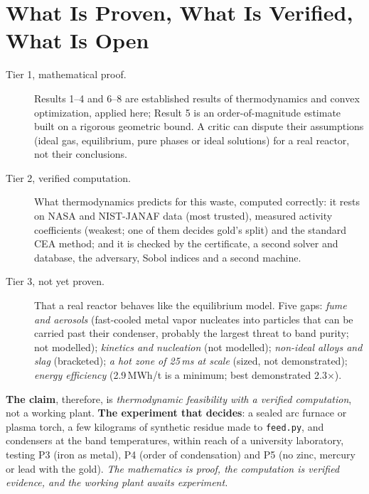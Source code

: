 \documentclass[11pt,a4paper]{article}
\begin{document}
\section{What Is Proven, What Is Verified, What Is Open}\label{ch:feasibility}
\begin{description}
\item[Tier 1, mathematical proof.] Results 1--4 and 6--8 are established results of thermodynamics and convex optimization, applied here; Result 5 is an order-of-magnitude estimate built on a rigorous geometric bound. A critic can dispute their assumptions (ideal gas, equilibrium, pure phases or ideal solutions) for a real reactor, not their conclusions.
\item[Tier 2, verified computation.] What thermodynamics predicts for this waste, computed correctly: it rests on NASA and NIST-JANAF data \citep{chase1998} (most trusted), measured activity coefficients (weakest; one of them decides gold's split) and the standard CEA method; and it is checked by the certificate, a second solver and database, the adversary, Sobol indices and a second machine.
\item[Tier 3, not yet proven.] That a real reactor behaves like the equilibrium model. Five gaps: \emph{fume and aerosols} (fast-cooled metal vapor nucleates into particles that can be carried past their condenser, probably the largest threat to band purity; not modelled); \emph{kinetics and nucleation} (not modelled); \emph{non-ideal alloys and slag} (bracketed); \emph{a hot zone of 25\,ms at scale} (sized, not demonstrated); \emph{energy efficiency} (2.9\,MWh/t is a minimum; best demonstrated 2.3$\times$).
\end{description}
\textbf{The claim}, therefore, is \emph{thermodynamic feasibility with a verified computation}, not a working plant. \textbf{The experiment that decides}: a sealed arc furnace or plasma torch, a few kilograms of synthetic residue made to \texttt{feed.py}, and condensers at the band temperatures, within reach of a university laboratory, testing P3 (iron as metal), P4 (order of condensation) and P5 (no zinc, mercury or lead with the gold). \emph{The mathematics is proof, the computation is verified evidence, and the working plant awaits experiment.}

\end{document}
